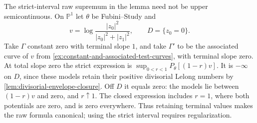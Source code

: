 \begin{example}\label{ex:test-curve-convolution-endpoints}
The strict-interval raw supremum in the lemma need not be upper semicontinuous. On $\mathbb P^1$ let $\theta$ be Fubini--Study and
\[
 v=\log\frac{|z_0|^2}{|z_0|^2+|z_1|^2},\qquad
                                      D=\{z_0=0\}.
\]
Take $\Gamma$ constant zero with terminal slope $1$, and take $\Gamma'$ to be the associated curve of $v$ from \cref{ex:constant-and-associated-test-curves}, with terminal slope zero. At total slope zero the strict expression is
$\sup_{0<r<1}P_\theta[(1-r)v]$.
It is $-\infty$ on $D$, since these models retain their positive divisorial Lelong numbers by \cref{lem:divisorial-envelope-closure}. Off $D$ it equals zero: the models lie between $(1-r)v$ and zero, and $r\uparrow1$. The closed expression includes $r=1$, where both potentials are zero, and is zero everywhere. Thus retaining terminal values makes the raw formula canonical; using the strict interval requires regularization.
\end{example}

